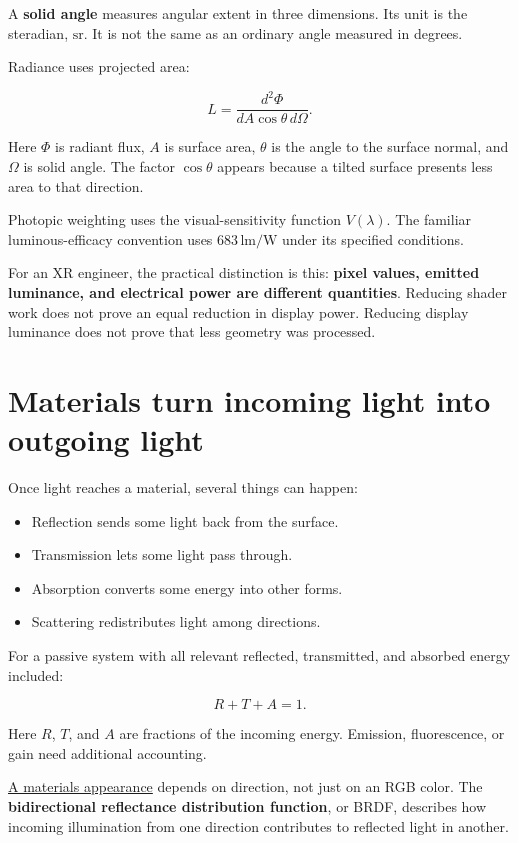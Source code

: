 A \textbf{solid angle} measures angular extent in three dimensions. Its unit is the steradian, \(\mathrm{sr}\). It is not the same as an ordinary angle measured in degrees.

Radiance uses projected area:

\[
L=\frac{d^2\Phi}{dA\cos\theta\,d\Omega}.
\]

Here \(\Phi\) is radiant flux, \(A\) is surface area, \(\theta\) is the angle to the surface normal, and \(\Omega\) is solid angle. The factor \(\cos\theta\) appears because a tilted surface presents less area to that direction.

Photopic weighting uses the visual-sensitivity function \(V(\lambda)\). The familiar luminous-efficacy convention uses \(683\,\mathrm{lm/W}\) under its specified conditions.

For an XR engineer, the practical distinction is this: \textbf{pixel values, emitted luminance, and electrical power are different quantities}. Reducing shader work does not prove an equal reduction in display power. Reducing display luminance does not prove that less geometry was processed.

\section{Materials turn incoming light into outgoing light}\label{04-visual-computing-ii-ch043-materials-turn-incoming-light-into-outgoing-light}

Once light reaches a material, several things can happen:

\begin{itemize}
\tightlist
\item
  Reflection sends some light back from the surface.
\item
  Transmission lets some light pass through.
\item
  Absorption converts some energy into other forms.
\item
  Scattering redistributes light among directions.
\end{itemize}

For a passive system with all relevant reflected, transmitted, and absorbed energy included:

\[
R+T+A=1.
\]

Here \(R\), \(T\), and \(A\) are fractions of the incoming energy. Emission, fluorescence, or gain need additional accounting.

\hyperref[appendix-96da0b153b77]{A material\textquotesingle s appearance} depends on direction, not just on an RGB color. The \textbf{bidirectional reflectance distribution function}, or BRDF, describes how incoming illumination from one direction contributes to reflected light in another.

